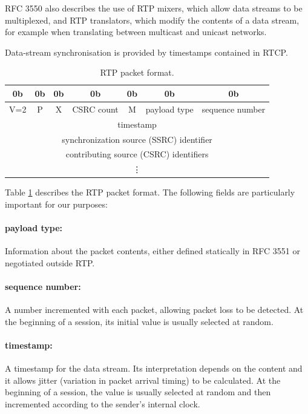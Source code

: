 RFC 3550 also describes the use of RTP mixers, which allow data streams to be multiplexed, and RTP translators, which modify the contents of a data stream, for example when translating between multicast and unicast networks.

Data-stream synchronisation is provided by timestamps contained in RTCP.

\begin{table}[htp]
\centering
\begin{tabular}[t]{|c|c|c|c|c|c|c|}
0b & 0b & 0b & 0b & 0b & 0b & 0b \\
\hline	V=2 & P & X & CSRC count & M & payload type & sequence number \\
\hline	\multicolumn{7}{|c|}{timestamp} \\
\hline	\multicolumn{7}{|c|}{synchronization source (SSRC) identifier} \\
\hline	\multicolumn{7}{|c|}{contributing source (CSRC) identifiers} \\
		\multicolumn{7}{|c|}{\vdots} \\
\hline
\end{tabular}
\caption{RTP packet format.}
\label{tab:RTP-packet-format}
\end{table}

Table \ref{tab:RTP-packet-format} describes the RTP packet format. The following fields are particularly important for our purposes:

\paragraph*{payload type:} Information about the packet contents, either defined statically in RFC 3551 \cite{RFC-3551-RTP-Profile-AudioVideo} or negotiated outside RTP.

\paragraph*{sequence number:} A number incremented with each packet, allowing packet loss to be detected. At the beginning of a session, its initial value is usually selected at random.

\paragraph*{timestamp:} A timestamp for the data stream. Its interpretation depends on the content and it allows jitter (variation in packet arrival timing) to be calculated. At the beginning of a session, the value is usually selected at random and then incremented according to the sender's internal clock.


